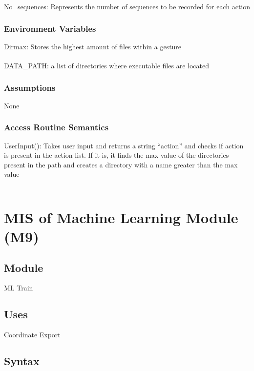 \documentclass[12pt, titlepage]{article}
\begin{document}
No\_sequences: Represents the number of sequences to be recorded for each action

\subsubsection{Environment Variables}

Dirmax: Stores the highest amount of files within a gesture\\
\\
DATA\_PATH:  a list of directories where executable files are located\\

\subsubsection{Assumptions}

None\\

\subsubsection{Access Routine Semantics}

UserInput(): Takes user input and returns a string “action” and checks if action is present in the action list. If it is, it finds the max value of the directories present in the path and creates a directory with a name greater than the max value\\

~\newpage

\section{MIS of Machine Learning Module (M9)} \label{M7}

\subsection{Module}

ML Train\\

\subsection{Uses}

Coordinate Export\\

\subsection{Syntax}
\end{document}
